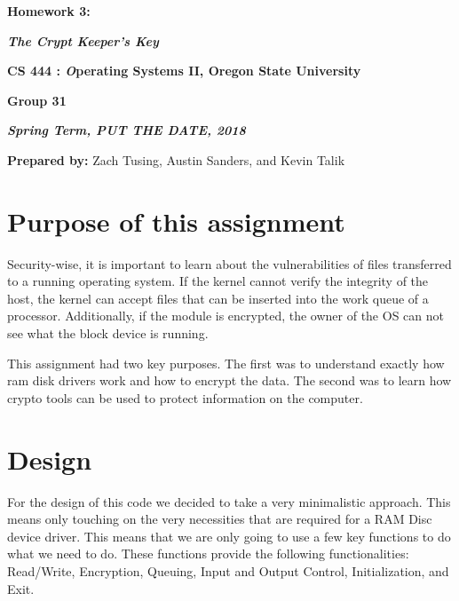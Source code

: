 \documentclass[onecolumn, draftclsnofoot,10pt, compsoc]{IEEEtran}
\def \GroupMemberOne{			Zach Tusing}
\def \GroupMemberTwo{			Austin Sanders}
\def \GroupMemberThree{			Kevin Talik}
\begin{document}
 	\begin{center}
	\huge\bf{ Homework 3:} 
   
    \large\textbf{\textit{ The Crypt Keeper's Key }}\par
     
    
    
	\small{\bf CS 444 : \textit Operating Systems II, Oregon State University}\par
    \small{\bf{Group 31}}
    
    
    {\bf\textit{ Spring Term, PUT THE DATE, 2018} }
    
    
    {\small {\bf Prepared by:} \GroupMemberOne, \GroupMemberTwo, and \GroupMemberThree }
        \end{center}
 		\vfill

       \pagebreak
       \section{ Purpose of this assignment }

        Security-wise, it is important to learn about the vulnerabilities of files transferred to a running operating system. If the kernel cannot verify the integrity of the host, the kernel can accept files that can be inserted into the work queue of a processor. Additionally, if the module is encrypted, the owner of the OS can not see what the block device is running. 

		This assignment had two key purposes. The first was to understand exactly how ram disk drivers work and how to encrypt the data. The second was to learn how crypto tools can be used to protect information on the computer. 

	\section{ Design }
    
    	For the design of this code we decided to take a very minimalistic approach. This means only touching on the very necessities that are required for a RAM Disc device driver. This means that we are only going to use a few key functions to do what we need to do. These functions provide the following functionalities: Read/Write, Encryption, Queuing, Input and Output Control, Initialization, and Exit.
\end{document}
